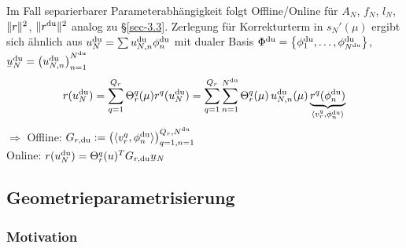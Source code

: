 \begin{bem}
	Im Fall separierbarer Parameterabhängigkeit folgt Offline/Online für $A_N$, $f_N$, $l_N$, $\|r\|^2$, $\|r^{\mathrm{du}}\|^2$ analog zu §\ref{sec-3.3}.
	Zerlegung für Korrekturterm in $s_N'(\mu)$ ergibt sich ähnlich aus $u_N^\du = \sum u_{N,n}^\du \phi_n^\du$ mit dualer Basis $\Phi^\du = \set{\phi_1^\du,\ldots,\phi_{N^\du}^\du}$, $\ubar u_N^\du = \seq{u_{N,n}^\du}_{n=1}^{N^\du}$
	\[
		r(u_N^\du) = \sum_{q=1}^{Q_r} \Theta_r^q(\mu) r^q(u_N^\du) = \sum_{q=1}^{Q_r} \sum_{n=1}^{N^\du} \Theta_r^q(\mu) \, u_{N,n}^\du(\mu) \underbrace{r^q(\phi_n^\du)}_{\dotp{v_r^q}{\phi_n^\du}}
	\]
	$\Rightarrow$ Offline: $G_{r,\du} := \seq{\dotp{v_r^q}{\phi_n^\du}}_{q=1,n=1}^{Q_r,N^\du}$\\
	Online: $r(u_N^\du) = \Theta_r^q(u)^T G_{r,\du} \ubar u_N$
\end{bem}

\subsection{Geometrieparametrisierung}

\subsubsection{Motivation}

